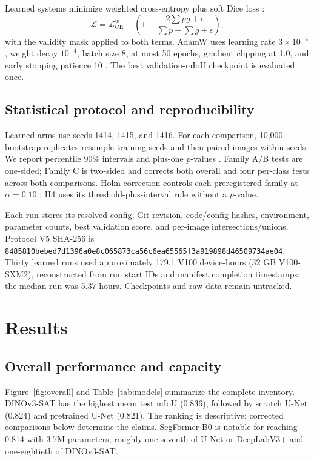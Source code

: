 \documentclass{article}
\newcommand{\miou}{\ensuremath{\mathrm{mIoU}}}
\newcommand{\code}[1]{\texttt{#1}}
\begin{document}
Learned systems minimize weighted cross-entropy plus soft Dice loss
\cite{milletari2016vnet}:
\begin{equation}
  \mathcal{L}=\mathcal{L}^{w}_{\mathrm{CE}}+
  \left(1-\frac{2\sum p g+\epsilon}{\sum p+\sum g+\epsilon}\right),
\end{equation}
with the validity mask applied to both terms. AdamW uses learning rate $3\times10^{-4}$, weight
decay $10^{-4}$, batch size 8, at most 50 epochs, gradient clipping at 1.0, and early stopping
patience 10 \cite{loshchilov2019adamw}. The best validation-\miou{} checkpoint is evaluated once.

\subsection{Statistical protocol and reproducibility}

Learned arms use seeds 1414, 1415, and 1416. For each comparison, 10,000 bootstrap replicates
resample training seeds and then paired images within seeds. We report percentile 90\% intervals
and plus-one $p$-values \cite{efron1993bootstrap}. Family A/B tests are one-sided; Family C is
two-sided and corrects both overall and four per-class tests across both comparisons. Holm
correction controls each preregistered family at $\alpha=0.10$ \cite{holm1979simple}; H4 uses its
threshold-plus-interval rule without a $p$-value.

Each run stores its resolved config, Git revision, code/config hashes, environment, parameter
counts, best validation score, and per-image intersections/unions. Protocol V5 SHA-256 is
\code{8485810bebed7d1396a0e8c065873ca56c6ea65565f3a919898d46509734ae04}. Thirty learned runs used
approximately 179.1 V100 device-hours (32 GB V100-SXM2), reconstructed from run start IDs and
manifest completion timestamps; the median run was 5.37 hours. Checkpoints and raw data remain
untracked.

\section{Results}

\subsection{Overall performance and capacity}

Figure~\ref{fig:overall} and Table~\ref{tab:models} summarize the complete inventory. DINOv3-SAT
has the highest mean test \miou{} (0.836), followed by scratch U-Net (0.824) and pretrained U-Net
(0.821). The ranking is descriptive; corrected comparisons below determine the claims. SegFormer
B0 is notable for reaching 0.814 with 3.7M parameters, roughly one-seventh of U-Net or
DeepLabV3+ and one-eightieth of DINOv3-SAT.
\end{document}
